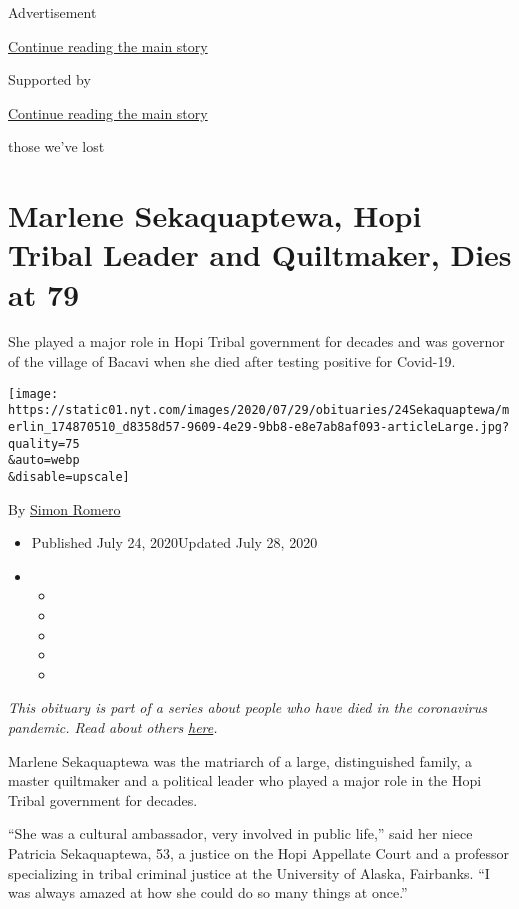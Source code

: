 Advertisement

\protect\hyperlink{after-top}{Continue reading the main story}

Supported by

\protect\hyperlink{after-sponsor}{Continue reading the main story}

those we've lost

\hypertarget{marlene-sekaquaptewa-hopi-tribal-leader-and-quiltmaker-dies-at-79}{%
\section{Marlene Sekaquaptewa, Hopi Tribal Leader and Quiltmaker, Dies
at
79}\label{marlene-sekaquaptewa-hopi-tribal-leader-and-quiltmaker-dies-at-79}}

She played a major role in Hopi Tribal government for decades and was
governor of the village of Bacavi when she died after testing positive
for Covid-19.

\texttt{[image: https://static01.nyt.com/images/2020/07/29/obituaries/24Sekaquaptewa/merlin\_174870510\_d8358d57-9609-4e29-9bb8-e8e7ab8af093-articleLarge.jpg?quality=75\\\&auto=webp\\\&disable=upscale]}

By \href{https://www.nytimes.com/by/simon-romero}{Simon Romero}

\begin{itemize}
\item
  Published July 24, 2020Updated July 28, 2020
\item
  \begin{itemize}
  \item
  \item
  \item
  \item
  \item
  \end{itemize}
\end{itemize}

\emph{This obituary is part of a series about people who have died in
the coronavirus pandemic. Read about others}
\href{https://www.nytimes.com/interactive/2020/obituaries/people-died-coronavirus-obituaries.html}{\emph{here}}\emph{.}

Marlene Sekaquaptewa was the matriarch of a large, distinguished family,
a master quiltmaker and a political leader who played a major role in
the Hopi Tribal government for decades.

``She was a cultural ambassador, very involved in public life,'' said
her niece Patricia Sekaquaptewa, 53, a justice on the Hopi Appellate
Court and a professor specializing in tribal criminal justice at the
University of Alaska, Fairbanks. ``I was always amazed at how she could
do so many things at once.''

